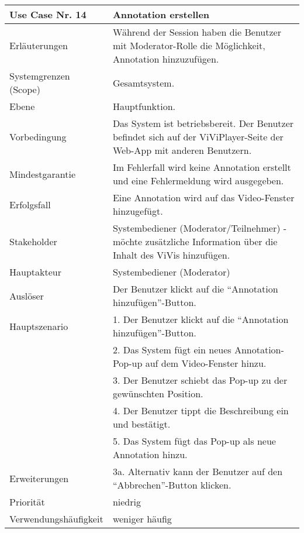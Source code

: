 \begin{tabularx}{\linewidth}{|l|X|}
	\hline
	Use Case Nr. 14			& \textbf{Annotation erstellen} \\ \hline
	Erläuterungen			& Während der Session haben die Benutzer mit Moderator-Rolle die 
							  Möglichkeit, Annotation hinzuzufügen. \\ \hline
	Systemgrenzen (Scope)	& Gesamtsystem. \\ \hline
	Ebene					& Hauptfunktion. \\ \hline
	Vorbedingung			& Das System ist betriebsbereit. Der Benutzer befindet sich auf 
							  der ViViPlayer-Seite der Web-App mit anderen Benutzern. \\ \hline
	Mindestgarantie			& Im Fehlerfall wird keine Annotation erstellt und eine 
							  Fehlermeldung wird ausgegeben. \\ \hline
	Erfolgsfall				& Eine Annotation wird auf das Video-Fenster hinzugefügt. \\ 
							  \hline
	Stakeholder				& Systembediener (Moderator/Teilnehmer) - möchte zusätzliche 
							  Information über die Inhalt des ViVis hinzufügen. \\ \hline
	Hauptakteur				& Systembediener (Moderator) \\ \hline
	Auslöser				& Der Benutzer klickt auf die ``Annotation hinzufügen''-Button. 
							  \\ \hline	
	Hauptszenario			& 1. Der Benutzer klickt auf die ``Annotation hinzufügen''-Button. 
							  \\
							& 2. Das System fügt ein neues Annotation-Pop-up auf dem 
							  Video-Fenster hinzu. \\
							& 3. Der Benutzer schiebt das Pop-up zu der gewünschten Position. \\
							& 4. Der Benutzer tippt die Beschreibung ein und bestätigt. \\
							& 5. Das System fügt das Pop-up als neue Annotation hinzu. \\ \hline
	Erweiterungen			& 3a. Alternativ kann der Benutzer auf den ``Abbrechen''-Button 
							 klicken. \\ \hline
	Priorität				& niedrig \\ \hline
	Verwendungshäufigkeit	& weniger häufig  \\ \hline
\end{tabularx}

